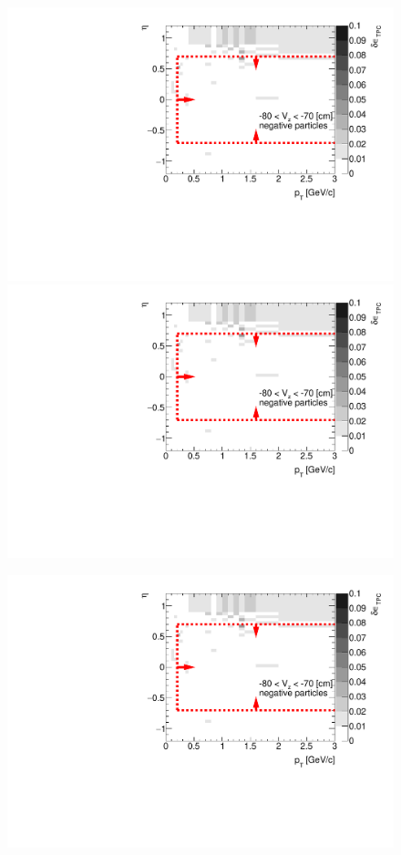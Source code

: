 \begin{figure}[H]
{		\includegraphics[width=\linewidth,page=27]{graphics/systematicsEfficiency/deadMaterial/secondaries_Unbinned_Charged_SDCD.pdf}
		\includegraphics[width=\linewidth,page=30]{graphics/systematicsEfficiency/deadMaterial/secondaries_Unbinned_Charged_SDCD.pdf}\\
	}%
	\parbox{0.325\textwidth}{
		\includegraphics[width=\linewidth,page=19]{graphics/systematicsEfficiency/deadMaterial/secondaries_Unbinned_Charged_SDCD.pdf}\\
}
\end{figure}
